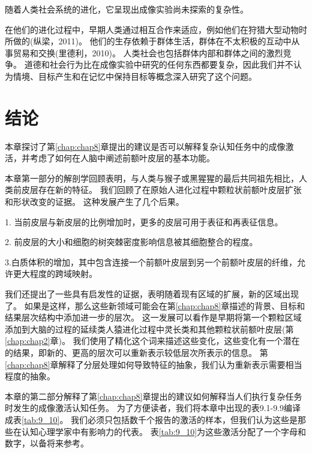 随着人类社会系统的进化，它呈现出成像实验尚未探索的复杂性。


在他们的进化过程中，早期人类通过相互合作来适应，例如他们在狩猎大型动物时所做的(纵梁，2011)。
他们的生存依赖于群体生活，群体在不太积极的互动中从事贸易和交换(里德利，2010)。
人类社会也包括群体内部和群体之间的激烈竞争。
道德和社会行为比在成像实验中研究的任何东西都要复杂，因此我们并不认为情境、目标产生和在记忆中保持目标等概念深入研究了这个问题。



\section{结论}

本章探讨了第\ref{chap:chap8}章提出的建议是否可以解释复杂认知任务中的成像激活，并考虑了如何在人脑中阐述前额叶皮层的基本功能。


本章第一部分的解剖学回顾表明，与人类与猴子或黑猩猩的最后共同祖先相比，人类前皮层存在新的特征。
我们回顾了在原始人进化过程中颗粒状前额叶皮层扩张和形状改变的证据。
这种发展产生了几个后果。


1. 当前皮层与新皮层的比例增加时，更多的皮层可用于表征和再表征信息。


2. 前皮层的大小和细胞的树突棘密度影响信息被其细胞整合的程度。


3.白质体积的增加，其中包含连接一个前额叶皮层到另一个前额叶皮层的纤维，允许更大程度的跨域映射。


我们还提出了一些具有启发性的证据，表明随着现有区域的扩展，新的区域出现了。
如果是这样，那么这些新领域可能会在第\ref{chap:chap8}章描述的背景、目标和结果层次结构中添加进一步的层次。
这一发展可以看作是早期将第一个颗粒区域添加到大脑的过程的延续类人猿进化过程中灵长类和其他颗粒状前额叶皮层(第\ref{chap:chap2}章)。
我们使用了精化这个词来描述这些变化，这些变化有一个潜在的结果，即新的、更高的层次可以重新表示较低层次所表示的信息。
第\ref{chap:chap8}章解释了分层处理如何导致特征的抽象，我们认为重新表示需要相当程度的抽象。


本章的第二部分解释了第\ref{chap:chap8}章提出的建议如何解释当人们执行复杂任务时发生的成像激活认知任务。
为了方便读者，我们将本章中出现的表9.1-9.9编译成表\ref{tab:9_10}。
我们必须只包括数千个报告的激活的样本，但我们认为这些是那些在认知心理学家中有影响力的代表。
表\ref{tab:9_10}为这些激活分配了一个字母和数字，以备将来参考。


